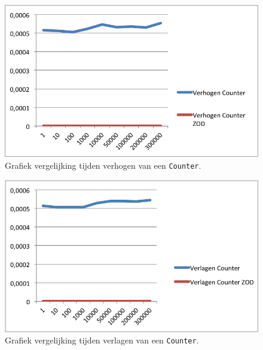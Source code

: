 \begin{figure}[!h]
  \centering
  \includegraphics[scale=1.0]{Afbeeldingen/Evaluatie/VerhogenCounter}
  \caption{Grafiek vergelijking tijden verhogen van een \texttt{Counter}.}
  \label{fig:GraphCounterInc}
\end{figure}

\begin{figure}[!h]
  \centering
  \includegraphics[scale=1.0]{Afbeeldingen/Evaluatie/VerlagenCounter}
  \caption{Grafiek vergelijking tijden verlagen van een \texttt{Counter}.}
  \label{fig:GraphCounterDec}
\end{figure}





